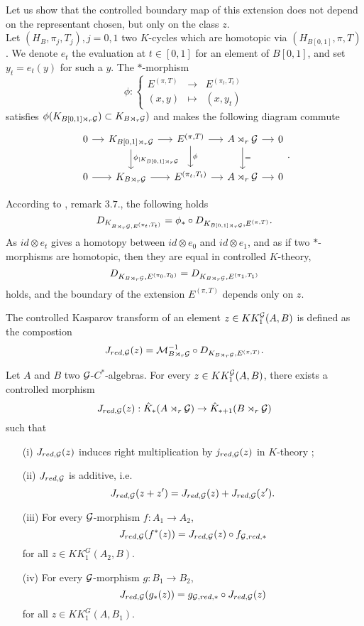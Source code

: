 Let us show that the controlled boundary map of this extension does not depend on the representant chosen, but only on the class $z$.\\
Let $(H_B, \pi_j,T_j), j=0,1$ two $K$-cycles which are homotopic via $(H_{B[0,1]},\pi,T)$. We denote $e_t$ the evaluation at $t\in[0,1]$ for an element of $B[0,1]$, and set $y_t=e_t(y)$ for such a $y$. The $*$-morphism
\[\phi : \left\{\begin{array}{lll}E^{(\pi,T)} & \rightarrow & E^{(\pi_t,T_t)} \\ (x,y) & \mapsto & (x, y_t)\end{array}\right.\]
satisfies $\phi(K_{B[0,1] \rtimes_r \mathcal G})\subset K_{B \rtimes_r \mathcal G})$ and makes the following diagram commute
\[\begin{tikzcd}[column sep = small]
0\arrow{r} & K_{B[0,1] \rtimes_r \G}\arrow{r}\arrow{d}{\phi_{|K_{B[0,1] \rtimes_r \G}}} & E^{(\pi,T)} \arrow{r}\arrow{d}{\phi} & A\rtimes_r \G \arrow{r}\arrow{d}{=}& 0 \\
0\arrow{r} & K_{B \rtimes_r \G}\arrow{r} &  E^{(\pi_t,T_t)} \arrow{r} & A\rtimes_r \G \arrow{r} & 0
\end{tikzcd}.\]

According to \cite{OY2}, remark $3.7.$, the following holds
\[D_{K_{B\rtimes_r\mathcal G,E^{(\pi_t,T_t)}}} = \phi_* \circ D_{K_{B[0,1]\rtimes_r\mathcal G},E^{(\pi,T)}}.\]
As $id \otimes e_t$ gives a homotopy between $id\otimes e_0$ and $id\otimes e_1$, and as if two $*$-morphisms are homotopic, then they are equal in controlled $K$-theory, 
\[D_{K_{B\rtimes_r \mathcal G}, E^{(\pi_0,T_0)}}=D_{K_{B\rtimes_r \mathcal G}, E^{(\pi_1,T_1)}}\]
holds, and the boundary of the extension $E^{(\pi,T)}$ depends only on $z$.\\

\begin{definition}
The controlled Kasparov transform of an element $z\in KK_1^\mathcal G(A,B)$ is defined as the compostion
\[J_{red,\mathcal G}(z)=\mathcal M_{B\rtimes_r \mathcal G}^{-1}\circ D_{K_{B\rtimes_r \mathcal G}, E^{(\pi,T)}}.\]
\end{definition}

\begin{prop}
Let $A$ and $B$ two $\mathcal G$-$C^*$-algebras. For every $z\in KK^\mathcal G_1(A,B)$, there exists a controlled morphism
\[J_{red,\mathcal G}(z) : \hat K_*(A\rtimes_r \mathcal G)\rightarrow \hat K_{*+1}(B\rtimes_r \mathcal G)\]
such that
\begin{enumerate}
\item[(i)] $J_{red,\mathcal G}(z)$ induces right multiplication by $j_{red,\mathcal G}(z)$ in $K$-theory ;
\item[(ii)] $J_{red,\mathcal G}$ is additive, i.e.
\[J_{red,\mathcal G}(z+z')=J_{red,\mathcal G}(z)+J_{red,\mathcal G}(z').\]
\item[(iii)] For every $\mathcal G$-morphism $f : A_1\rightarrow A_2$,
\[J_{red,\mathcal G}(f^*(z))=J_{red,\mathcal G}(z)\circ f_{\mathcal G,red,*}\] for all $z\in KK_1^G(A_2,B)$.
\item[(iv)] For every $\mathcal G$-morphism $g : B_1\rightarrow B_2$,
\[J_{red,\mathcal G}(g_*(z))= g_{\mathcal G,red,*}\circ J_{red,\mathcal G}(z)\] for all $z\in KK_1^G(A,B_1)$.
\end{enumerate}
\end{prop}

